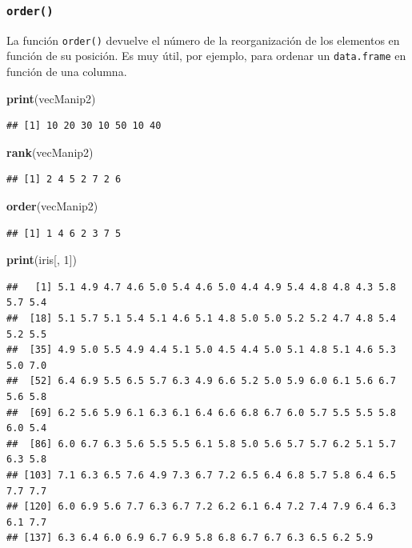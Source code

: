 \documentclass[]{book}
\newenvironment{Shaded}{\begin{snugshade}}{\end{snugshade}}
\newcommand{\KeywordTok}[1]{\textcolor[rgb]{0.13,0.29,0.53}{\textbf{#1}}}
\newcommand{\DecValTok}[1]{\textcolor[rgb]{0.00,0.00,0.81}{#1}}
\newcommand{\NormalTok}[1]{#1}
\begin{document}
\subsubsection{\texorpdfstring{\texttt{order()}}{order()}}\label{l015order}

La función \texttt{order()} devuelve el número de la reorganización de
los elementos en función de su posición. Es muy útil, por ejemplo, para
ordenar un \texttt{data.frame} en función de una columna.

\begin{Shaded}
\begin{Highlighting}[]
\KeywordTok{print}\NormalTok{(vecManip2)}
\end{Highlighting}
\end{Shaded}

\begin{verbatim}
## [1] 10 20 30 10 50 10 40
\end{verbatim}

\begin{Shaded}
\begin{Highlighting}[]
\KeywordTok{rank}\NormalTok{(vecManip2)}
\end{Highlighting}
\end{Shaded}

\begin{verbatim}
## [1] 2 4 5 2 7 2 6
\end{verbatim}

\begin{Shaded}
\begin{Highlighting}[]
\KeywordTok{order}\NormalTok{(vecManip2)}
\end{Highlighting}
\end{Shaded}

\begin{verbatim}
## [1] 1 4 6 2 3 7 5
\end{verbatim}

\begin{Shaded}
\begin{Highlighting}[]
\KeywordTok{print}\NormalTok{(iris[, }\DecValTok{1}\NormalTok{])}
\end{Highlighting}
\end{Shaded}

\begin{verbatim}
##   [1] 5.1 4.9 4.7 4.6 5.0 5.4 4.6 5.0 4.4 4.9 5.4 4.8 4.8 4.3 5.8 5.7 5.4
##  [18] 5.1 5.7 5.1 5.4 5.1 4.6 5.1 4.8 5.0 5.0 5.2 5.2 4.7 4.8 5.4 5.2 5.5
##  [35] 4.9 5.0 5.5 4.9 4.4 5.1 5.0 4.5 4.4 5.0 5.1 4.8 5.1 4.6 5.3 5.0 7.0
##  [52] 6.4 6.9 5.5 6.5 5.7 6.3 4.9 6.6 5.2 5.0 5.9 6.0 6.1 5.6 6.7 5.6 5.8
##  [69] 6.2 5.6 5.9 6.1 6.3 6.1 6.4 6.6 6.8 6.7 6.0 5.7 5.5 5.5 5.8 6.0 5.4
##  [86] 6.0 6.7 6.3 5.6 5.5 5.5 6.1 5.8 5.0 5.6 5.7 5.7 6.2 5.1 5.7 6.3 5.8
## [103] 7.1 6.3 6.5 7.6 4.9 7.3 6.7 7.2 6.5 6.4 6.8 5.7 5.8 6.4 6.5 7.7 7.7
## [120] 6.0 6.9 5.6 7.7 6.3 6.7 7.2 6.2 6.1 6.4 7.2 7.4 7.9 6.4 6.3 6.1 7.7
## [137] 6.3 6.4 6.0 6.9 6.7 6.9 5.8 6.8 6.7 6.7 6.3 6.5 6.2 5.9
\end{verbatim}
\end{document}
